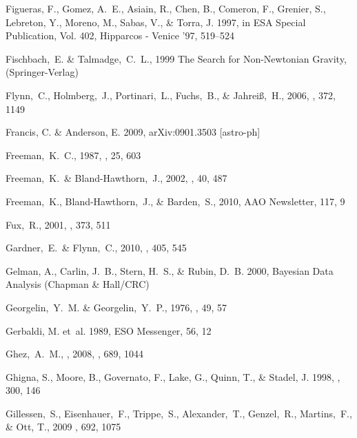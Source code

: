 \begin{thebibliography}{99}
{Figueras}, F., {Gomez}, A.~E., {Asiain}, R., {Chen}, B., {Comeron}, F.,
  {Grenier}, S., {Lebreton}, Y., {Moreno}, M., {Sabas}, V., \& {Torra}, J.
  1997, in ESA Special Publication, Vol. 402, Hipparcos - Venice '97, 519--524

  Fischbach,~E. \& Talmadge,~C.~L., 1999
  The Search for Non-Newtonian Gravity,
  (Springer-Verlag)

  Flynn,~C., Holmberg,~J., Portinari,~L., Fuchs,~B., \& Jahrei{\ss},~H., 2006,
  \mnras, 372, 1149

{Francis}, C. \& {Anderson}, E. 2009, arXiv:0901.3503 [astro-ph]

  Freeman,~K.~C., 1987, \araa, 25, 603

  Freeman,~K.~\& Bland-Hawthorn,~J., 2002,
  \araa, 40, 487

  Freeman,~K., Bland-Hawthorn,~J., \& Barden,~S., 2010, 
  AAO Newsletter, 117, 9

  Fux,~R., 2001,
  \aap, 373, 511

  Gardner,~E.~\& Flynn,~C., 2010,
  \mnras, 405, 545

{Gelman}, A., {Carlin}, J.~B., {Stern}, H.~S., \& {Rubin}, D.~B. 2000,
  {Bayesian Data Analysis} ({Chapman \& Hall/CRC})

  Georgelin,~Y.~M. \& Georgelin,~Y.~P., 1976, \aap, 49, 57

{Gerbaldi}, M. {et~al.} 1989, ESO Messenger, 56, 12

  Ghez,~A.~M., \etal, 2008,
  \apj, 689, 1044

{Ghigna}, S., {Moore}, B., {Governato}, F., {Lake}, G., {Quinn}, T., \&
  {Stadel}, J. 1998, \mnras, 300, 146

  Gillessen,~S., Eisenhauer,~F., Trippe,~S., Alexander,~T., Genzel,~R., Martins,~F., \& Ott, T., 2009
  \apj, 692, 1075


\end{thebibliography}
